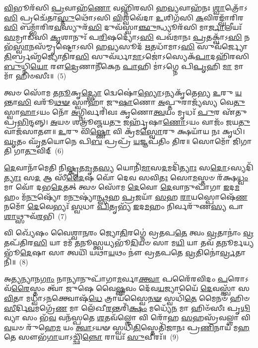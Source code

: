 {\anuvakamend[{\-\ul{𑌹}\-𑌨𑍍𑌤𑍇𑌨𑍍𑌦𑍍𑌰𑌾᳴\-\ul{𑌯} 𑌦𑍍𑌵𑍇 𑌚᳴}]}%

\-\ul{𑌵𑌿}\-𑌭𑍂𑌰᳴𑌸𑌿 \ul{𑌪𑍍𑌰}\-𑌵𑌾𑌹᳴\-\ul{𑌣𑍋} 𑌵𑌹𑍍𑌨𑌿᳴𑌰𑌸𑌿 𑌹\-\ul{𑌵𑍍𑌯}\-𑌵𑌾𑌹᳴𑌨𑌃 \ul{𑌶𑍍𑌵𑌾}\-𑌤𑍍𑌰𑍋᳴\-𑌽\-\ul{𑌸𑌿} 𑌪𑍍𑌰𑌚𑍇᳴𑌤𑌾\-\ul{𑌸𑍍𑌤𑍁}\-𑌥𑍋᳴\-𑌽𑌸𑌿 \ul{𑌵𑌿}\-𑌶𑍍𑌵𑌵𑍇᳴𑌦𑌾 \ul{𑌉}\-𑌶𑌿𑌗᳴𑌸𑌿 \ul{𑌕}\-𑌵𑌿𑌰𑌙𑍍𑌘𑌾᳴𑌰𑌿𑌰\-\ul{𑌸𑌿} 𑌬𑌮𑍍𑌭𑌾᳴𑌰𑌿𑌰\-\ul{𑌵}\-𑌸𑍍𑌯𑍁𑌰᳴\-\ul{𑌸𑌿} 𑌦𑍁𑌵᳴𑌸𑍍𑌵𑌾\-\ul{𑌞𑍍𑌛𑍁}\-𑌨𑍍𑌧𑍍𑌯𑍂𑌰᳴𑌸𑌿 𑌮𑌾\-\ul{𑌰𑍍𑌜𑌾}\-𑌲𑍀𑌯𑌃᳴ \ul{𑌸}\-𑌮𑍍𑌰𑌾𑌡᳴𑌸𑌿 \ul{𑌕𑍃}\-𑌶𑌾𑌨𑍁𑌃᳴ 𑌪\-\ul{𑌰𑌿}\-𑌷𑌦𑍍𑌯𑍋᳴\-𑌽\-\ul{𑌸𑌿} 𑌪𑌵᳴𑌮𑌾𑌨𑌃 \ul{𑌪𑍍𑌰}\-𑌤𑌕𑍍𑌵𑌾᳴\-𑌽\-\ul{𑌸𑌿} 𑌨𑌭᳴\-\ul{𑌸𑍍𑌵𑌾}\-𑌨𑌸᳴𑌮𑍍𑌮𑍃𑌷𑍍𑌟𑍋\-𑌽𑌸𑌿 𑌹\-\ul{𑌵𑍍𑌯}\-𑌸𑍂𑌦᳴ \ul{𑌋}\-𑌤𑌧𑌾᳴𑌮𑌾\-𑌽\-\ul{𑌸𑌿} 𑌸𑍁𑌵᳴𑌰𑍍𑌜𑍍𑌯𑍋\-\ul{𑌤𑌿}\-𑌰𑍍𑌬𑍍𑌰𑌹𑍍𑌮᳴𑌜𑍍𑌯𑍋𑌤𑌿𑌰\-\ul{𑌸𑌿} 𑌸𑍁𑌵᳴𑌰𑍍𑌧𑌾\-\ul{𑌮𑌾}\-\-𑌽𑌜𑍋॑\-𑌽𑌸𑍍𑌯𑍇𑌕᳴\-\ul{𑌪𑌾}\-𑌦𑌹𑌿᳴𑌰𑌸𑌿 \ul{𑌬𑍁}\-𑌧𑍍𑌨𑌿\-\ul{𑌯𑍋} 𑌰𑍗\-\ul{𑌦𑍍𑌰𑍇}\-𑌣𑌾𑌨𑍀᳴𑌕𑍇𑌨 \ul{𑌪𑌾}\-𑌹𑌿 𑌮𑌾॑\-𑌽𑌗𑍍𑌨𑍇 𑌪𑌿\-\ul{𑌪𑍃}\-𑌹𑌿 \ul{𑌮𑌾} 𑌮𑌾 𑌮𑌾᳴ 𑌹𑌿𑍞𑌸𑍀𑌃॥~(5)

{\anuvakamend[{𑌅𑌨𑍀᳴𑌕𑍇\-\ul{𑌨𑌾}\-𑌷𑍍𑌟𑍗 𑌚᳴}]}%

𑌤𑍍𑌵𑍞 𑌸𑍋᳴𑌮 𑌤\-\ul{𑌨𑍂}\-𑌕𑍃\-\ul{𑌦𑍍𑌭𑍍𑌯𑍋} 𑌦𑍍𑌵𑍇𑌷𑍋॑\-\ul{𑌭𑍍𑌯𑍋}\-\-𑌽𑌨𑍍𑌯𑌕𑍃᳴𑌤𑍇𑌭𑍍𑌯 \ul{𑌉}\-𑌰𑍁 \ul{𑌯}\-𑌨𑍍𑌤𑌾\-\ul{𑌸𑌿} 𑌵𑌰𑍂᳴\-\ul{𑌥}\-\-\ul{𑍟} 𑌸𑍍𑌵𑌾𑌹𑌾᳴ 𑌜𑍁\-\ul{𑌷𑌾}\-𑌣𑍋 \ul{𑌅}\-𑌪𑍍𑌤𑍁𑌰𑌾𑌜𑍍𑌯᳴𑌸𑍍𑌯 𑌵𑍇\-\ul{𑌤𑍁} 𑌸𑍍𑌵𑌾\-\ul{𑌹𑌾}\-\-𑌽𑌯𑌂 𑌨𑍋᳴ \ul{𑌅}\-𑌗𑍍𑌨𑌿𑌰𑍍𑌵𑌰𑌿᳴𑌵𑌃 𑌕𑍃𑌣𑍋\-\ul{𑌤𑍍𑌵}\-𑌯𑌂 𑌮𑍃𑌧𑌃᳴ \ul{𑌪𑍁}\-𑌰 𑌏᳴𑌤𑍁 𑌪𑍍𑌰\-\ul{𑌭𑌿}\-𑌨𑍍𑌦𑌨𑍍𑌨𑍍। \ul{𑌅}\-𑌯𑍞 𑌶𑌤𑍍𑌰𑍂॑𑌞𑍍𑌜𑌯\-\ul{𑌤𑍁} 𑌜𑌰𑍍\mbox{}𑌹𑍃᳴𑌷𑌾\-\ul{𑌣𑍋}\-\-𑌽𑌯𑌂 𑌵𑌾𑌜𑌂᳴ 𑌜𑌯\-\ul{𑌤𑍁} 𑌵𑌾𑌜᳴𑌸𑌾𑌤𑍗॥ \ul{𑌉}\-𑌰𑍁 𑌵𑌿᳴\-\ul{𑌷𑍍𑌣𑍋} 𑌵𑌿 𑌕𑍍𑌰᳴𑌮\-\ul{𑌸𑍍𑌵𑍋}\-𑌰𑍁 𑌕𑍍𑌷𑌯𑌾᳴𑌯 𑌨𑌃 𑌕𑍃𑌧𑌿। \ul{𑌘𑍃}\-𑌤𑌂 𑌘𑍃᳴𑌤𑌯𑍋𑌨𑍇 𑌪𑌿\-\ul{𑌬} 𑌪𑍍𑌰𑌪𑍍𑌰᳴ \ul{𑌯}\-𑌜𑍍𑌞𑌪᳴𑌤𑌿𑌂 𑌤𑌿𑌰॥ 𑌸𑍋𑌮𑍋᳴ 𑌜𑌿𑌗𑌾𑌤𑌿 𑌗𑌾\-\ul{𑌤𑍁}\-𑌵𑌿𑌦𑍍~(6)

\-\ul{𑌦𑍇}\-𑌵𑌾𑌨𑌾᳴𑌮𑍇𑌤𑌿 𑌨𑌿\-\ul{𑌷𑍍𑌕𑍃}\-𑌤\-\ul{𑌮𑍃}\-𑌤\-\ul{𑌸𑍍𑌯} 𑌯𑍋𑌨𑌿᳴\-\ul{𑌮𑌾}\-𑌸\-\ul{𑌦}\-𑌮𑌦𑌿᳴\-\ul{𑌤𑍍𑌯𑌾𑌃} 𑌸\-\ul{𑌦𑍋}\-\-𑌽𑌸𑍍𑌯𑌦𑌿᳴\-\ul{𑌤𑍍𑌯𑌾𑌃} 𑌸\-\ul{𑌦} 𑌆 𑌸𑍀᳴\-\ul{𑌦𑍈}\-𑌷 𑌵𑍋᳴ 𑌦𑍇𑌵 𑌸𑌵𑌿\-\ul{𑌤𑌃} 𑌸𑍋\-\ul{𑌮}\-𑌸𑍍𑌤𑍞 𑌰᳴𑌕𑍍𑌷\-\ul{𑌧𑍍𑌵𑌂} 𑌮𑌾 𑌵𑍋᳴ 𑌦𑌭\-\ul{𑌦𑍇}\-𑌤𑌤𑍍 𑌤𑍍𑌵𑍞 𑌸𑍋᳴𑌮 \ul{𑌦𑍇}\-𑌵𑍋 \ul{𑌦𑍇}\-𑌵𑌾𑌨𑍁𑌪𑌾᳴𑌗𑌾 \ul{𑌇}\-𑌦\-\ul{𑌮}\-𑌹𑌂 𑌮᳴\-\ul{𑌨𑍁}\-𑌷𑍍𑌯𑍋᳴ 𑌮\-\ul{𑌨𑍁}\-𑌷𑍍𑌯𑌾॑\-\ul{𑌨𑍍𑌥𑍍𑌸}\-𑌹 \ul{𑌪𑍍𑌰}\-𑌜𑌯𑌾᳴ \ul{𑌸}\-𑌹 \ul{𑌰𑌾}\-𑌯𑌸𑍍𑌪𑍋𑌷𑍇᳴\-\ul{𑌣} 𑌨𑌮𑍋᳴ \ul{𑌦𑍇}\-𑌵𑍇𑌭𑍍𑌯𑌃᳴ \ul{𑌸𑍍𑌵}\-𑌧𑌾 \ul{𑌪𑌿}\-𑌤𑍃𑌭𑍍𑌯᳴ \ul{𑌇}\-𑌦\-\ul{𑌮}\-𑌹𑌂 𑌨𑌿𑌰𑍍𑌵𑌰𑍁᳴𑌣\-\ul{𑌸𑍍𑌯} 𑌪𑌾\-\ul{𑌶𑌾}\-𑌥𑍍𑌸𑍁𑌵᳴\-\ul{𑌰}\-𑌭𑌿~(7)

𑌵𑌿 𑌖𑍍𑌯𑍇᳴𑌷𑌂 𑌵𑍈𑌶𑍍𑌵𑌾\-\ul{𑌨}\-𑌰𑌂 𑌜𑍍𑌯𑍋\-\ul{𑌤𑌿}\-𑌰𑌗𑍍𑌨𑍇॑ 𑌵𑍍𑌰𑌤𑌪\-\ul{𑌤𑍇} 𑌤𑍍𑌵𑌂 \ul{𑌵𑍍𑌰}\-𑌤𑌾𑌨𑌾𑌂॑ \ul{𑌵𑍍𑌰}\-𑌤𑌪᳴𑌤𑌿𑌰\-\ul{𑌸𑌿} 𑌯𑌾 𑌮𑌮᳴ \ul{𑌤}\-𑌨𑍂𑌸𑍍𑌤𑍍𑌵𑌯𑍍𑌯𑌭𑍂᳴\-\ul{𑌦𑌿}\-𑌯𑍞 𑌸𑌾 𑌮\-\ul{𑌯𑌿} 𑌯𑌾 𑌤𑌵᳴ \ul{𑌤}\-𑌨𑍂𑌰𑍍𑌮𑌯𑍍𑌯𑌭𑍂᳴\-\ul{𑌦𑍇}\-𑌷𑌾 𑌸𑌾 𑌤𑍍𑌵𑌯𑌿᳴ 𑌯𑌥𑌾\-\ul{𑌯}\-𑌥𑌂 𑌨𑍗॑ 𑌵𑍍𑌰𑌤𑌪𑌤𑍇 \ul{𑌵𑍍𑌰}\-𑌤𑌿𑌨𑍋॑\-\ul{𑌰𑍍𑌵𑍍𑌰}\-𑌤𑌾𑌨𑌿᳴॥~(8)

{\anuvakamend[{\-\ul{𑌗𑌾}\-\-\ul{𑌤𑍁}\-𑌵𑌿\-\ul{𑌦}\-𑌭𑍍𑌯𑍇𑌕᳴𑌤𑍍𑌰𑌿𑍞𑌶𑌚𑍍𑌚}]}%

𑌅\-\ul{𑌤𑍍𑌯}\-𑌨𑍍𑌯𑌾𑌨\-\ul{𑌗𑌾𑌂} 𑌨𑌾𑌨𑍍𑌯𑌾𑌨𑍁𑌪𑌾᳴𑌗𑌾\-\ul{𑌮}\-𑌰𑍍𑌵𑌾\-\ul{𑌕𑍍𑌤𑍍𑌵𑌾} 𑌪𑌰𑍈᳴𑌰𑌵𑌿𑌦𑌂 \ul{𑌪}\-𑌰𑍋\-𑌽𑌵᳴\-\ul{𑌰𑍈}\-𑌸𑍍𑌤𑌂 𑌤𑍍𑌵𑌾᳴ 𑌜𑍁𑌷𑍇 𑌵𑍈\-\ul{𑌷𑍍𑌣}\-𑌵𑌂 𑌦𑍇᳴𑌵\-\ul{𑌯}\-𑌜𑍍𑌯𑌾𑌯𑍈᳴ \ul{𑌦𑍇}\-𑌵𑌸𑍍𑌤𑍍𑌵𑌾᳴ 𑌸\-\ul{𑌵𑌿}\-𑌤𑌾 𑌮𑌧𑍍𑌵𑌾᳴\-𑌽\-\ul{𑌨}\-𑌕𑍍𑌤𑍍𑌵𑍋𑌷᳴\-\ul{𑌧𑍇} 𑌤𑍍𑌰𑌾𑌯᳴𑌸𑍍𑌵𑍈\-\ul{𑌨}\-\-\ul{𑍟} 𑌸𑍍𑌵𑌧𑌿᳴\-\ul{𑌤𑍇} 𑌮𑍈𑌨𑍞᳴ 𑌹𑌿𑍞\-\ul{𑌸𑍀}\-𑌰𑍍𑌦𑌿\-\ul{𑌵}\-𑌮𑌗𑍍𑌰𑍇᳴\-\ul{𑌣} 𑌮𑌾 𑌲𑍇᳴𑌖𑍀\-\ul{𑌰}\-𑌨𑍍𑌤𑌰𑌿᳴\-\ul{𑌕𑍍𑌷𑌂} 𑌮𑌧𑍍𑌯𑍇᳴\-\ul{𑌨} 𑌮𑌾 𑌹𑌿𑍞᳴𑌸𑍀𑌃 𑌪𑍃\-\ul{𑌥𑌿}\-𑌵𑍍𑌯𑌾 𑌸𑌂 𑌭᳴\-\ul{𑌵} 𑌵𑌨᳴𑌸𑍍𑌪𑌤𑍇 \ul{𑌶}\-𑌤𑌵᳴𑌲𑍍\mbox{}\-\ul{𑌶𑍋} 𑌵𑌿 𑌰𑍋᳴𑌹 \ul{𑌸}\-𑌹𑌸𑍍𑌰᳴𑌵𑌲𑍍\mbox{}\-\ul{𑌶𑌾} 𑌵𑌿 \ul{𑌵}\-𑌯𑍞 𑌰𑍁᳴𑌹𑍇\-\ul{𑌮} 𑌯𑌂 \ul{𑌤𑍍𑌵𑌾}\-\-𑌽𑌯𑍟 𑌸𑍍𑌵𑌧𑌿᳴\-\ul{𑌤𑌿}\-𑌸𑍍𑌤𑍇𑌤𑌿᳴𑌜𑌾𑌨𑌃 𑌪𑍍𑌰\-\ul{𑌣𑌿}\-𑌨𑌾𑌯᳴ 𑌮\-\ul{𑌹}\-𑌤𑍇 𑌸𑍗𑌭᳴\-\ul{𑌗𑌾}\-𑌯𑌾\-𑌽𑌚𑍍𑌛𑌿᳴\-\ul{𑌨𑍍𑌨𑍋} 𑌰𑌾𑌯𑌃᳴ \ul{𑌸𑍁}\-𑌵𑍀𑌰𑌃᳴॥~(9)


